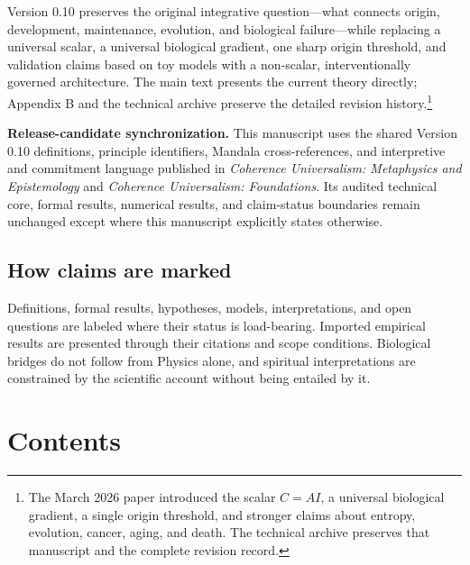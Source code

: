 \documentclass[
  11pt,
]{article}
\begin{document}
Version 0.10 preserves the original integrative question---what connects
origin, development, maintenance, evolution, and biological
failure---while replacing a universal scalar, a universal biological
gradient, one sharp origin threshold, and validation claims based on toy
models with a non-scalar, interventionally governed architecture. The
main text presents the current theory directly; Appendix B and the
technical archive preserve the detailed revision history.\footnote{The
  March 2026 paper introduced the scalar \(C=A I\), a universal
  biological gradient, a single origin threshold, and stronger claims
  about entropy, evolution, cancer, aging, and death. The technical
  archive preserves that manuscript and the complete revision record.}

\textbf{Release-candidate synchronization.} This manuscript uses the
shared Version 0.10 definitions, principle identifiers, Mandala
cross-references, and interpretive and commitment language published in
\emph{Coherence Universalism: Metaphysics and Epistemology} and
\emph{Coherence Universalism: Foundations}. Its audited technical core,
formal results, numerical results, and claim-status boundaries remain
unchanged except where this manuscript explicitly states otherwise.

\subsection{How claims are marked}\label{how-claims-are-marked}

Definitions, formal results, hypotheses, models, interpretations, and
open questions are labeled where their status is load-bearing. Imported
empirical results are presented through their citations and scope
conditions. Biological bridges do not follow from Physics alone, and
spiritual interpretations are constrained by the scientific account
without being entailed by it.

\section{Contents}\label{contents}
\end{document}

